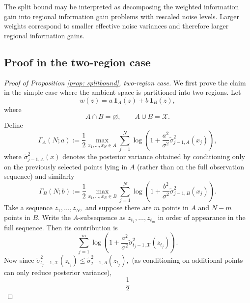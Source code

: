 \begin{remark}
The split bound may be interpreted as decomposing the weighted information gain into regional information gain problems with rescaled noise levels. Larger weights correspond to smaller effective noise variances and therefore larger regional information gains.
\end{remark}

\subsection{Proof in the two-region case}

\begin{proof}[Proof of Proposition \ref{prop: splitbound}, two-region case]
We first prove the claim in the simple case where the ambient space is partitioned into two regions. Let
\begin{equation*}
w(z)
=
a\,\mathbf{1}_A(z)
+
b\,\mathbf{1}_B(z),
\end{equation*}
where
\begin{equation*}
A\cap B=\varnothing,
\qquad
A\cup B=\mathcal{X}.
\end{equation*}
Define
\begin{equation*}
\Gamma_A(N;a)
:= \frac{1}{2}
\max_{x_1,\dots,x_N\in A}
\sum_{j=1}^N
\log\!\left(
1+
\frac{a^2}{\sigma^2}
\tilde{\sigma}_{j-1,A}^2(x_j)
\right),
\end{equation*}
where $\tilde{\sigma}_{j-1,A}^2(x)$ denotes the posterior variance obtained by conditioning only on the previously selected points lying in $A$ (rather than on the full observation sequence)
and similarly
\begin{equation*}
\Gamma_B(N;b)
:= \frac{1}{2}
\max_{x_1,\dots,x_N\in B}
\sum_{j=1}^N
\log\!\left(
1+
\frac{b^2}{\sigma^2}
\tilde{\sigma}_{j-1,B}^2(x_j)
\right).
\end{equation*}
Take a sequence $z_1,\dots,z_N,$
and suppose there are $m$ points in $A$ and $N-m$ points in $B$.
Write the $A$-subsequence as $z_{t_1},\dots,z_{t_m}$
in order of appearance in the full sequence. Then its contribution is
\begin{equation*}
\sum_{j=1}^m
\log\!\left(
1+
\frac{a^2}{\sigma^2}
\tilde{\sigma}_{t_j-1,\mathcal{X}}^2(z_{t_j})
\right).
\end{equation*}
Now since $\tilde{\sigma}_{t_j-1,\mathcal{X}}^2(z_{t_j})
\leq
\tilde{\sigma}_{j-1,A}^2(z_{t_j}),$
(as conditioning on additional points can only reduce posterior variance),
\begin{equation*} \frac{1}{2}

\end{equation*}
\end{proof}
